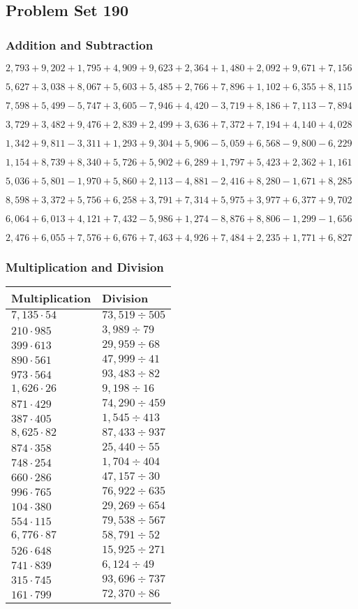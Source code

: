 \hypertarget{problem-set-190}{%
\subsection{Problem Set 190}\label{problem-set-190}}

\hypertarget{addition-and-subtraction}{%
\subsubsection{Addition and
Subtraction}\label{addition-and-subtraction}}

\(2,793+9,202+1,795+4,909+9,623+2,364+1,480+2,092+9,671+7,156\)

\(5,627+3,038+8,067+5,603+5,485+2,766+7,896+1,102+6,355+8,115\)

\(7,598+5,499-5,747+3,605-7,946+4,420-3,719+8,186+7,113-7,894\)

\(3,729+3,482+9,476+2,839+2,499+3,636+7,372+7,194+4,140+4,028\)

\(1,342+9,811-3,311+1,293+9,304+5,906-5,059+6,568-9,800-6,229\)

\(1,154+8,739+8,340+5,726+5,902+6,289+1,797+5,423+2,362+1,161\)

\(5,036+5,801-1,970+5,860+2,113-4,881-2,416+8,280-1,671+8,285\)

\(8,598+3,372+5,756+6,258+3,791+7,314+5,975+3,977+6,377+9,702\)

\(6,064+6,013+4,121+7,432-5,986+1,274-8,876+8,806-1,299-1,656\)

\(2,476+6,055+7,576+6,676+7,463+4,926+7,484+2,235+1,771+6,827\)

\hypertarget{multiplication-and-division}{%
\subsubsection{Multiplication and
Division}\label{multiplication-and-division}}

\begin{longtable}[]{@{}ll@{}}
\toprule
Multiplication & Division\tabularnewline
\midrule
\endhead
\(7,135\cdot54\) & \(73,519÷505\)\tabularnewline
\(210\cdot985\) & \(3,989÷79\)\tabularnewline
\(399\cdot613\) & \(29,959÷68\)\tabularnewline
\(890\cdot561\) & \(47,999 ÷41\)\tabularnewline
\(973\cdot564\) & \(93,483÷82\)\tabularnewline
\(1,626\cdot26\) & \(9,198÷16\)\tabularnewline
\(871\cdot429\) & \(74,290÷459\)\tabularnewline
\(387\cdot405\) & \(1,545÷413\)\tabularnewline
\(8,625\cdot82\) & \(87,433÷937\)\tabularnewline
\(874\cdot358\) & \(25,440÷55\)\tabularnewline
\(748\cdot254\) & \(1,704÷404\)\tabularnewline
\(660\cdot286\) & \(47,157÷30\)\tabularnewline
\(996\cdot765\) & \(76,922÷635\)\tabularnewline
\(104\cdot380\) & \(29,269÷654\)\tabularnewline
\(554\cdot115\) & \(79,538÷567\)\tabularnewline
\(6,776\cdot87\) & \(58,791÷52\)\tabularnewline
\(526\cdot648\) & \(15,925÷271\)\tabularnewline
\(741\cdot839\) & \(6,124÷49\)\tabularnewline
\(315\cdot745\) & \(93,696÷737\)\tabularnewline
\(161\cdot799\) & \(72,370÷86\)\tabularnewline
\bottomrule
\end{longtable}
